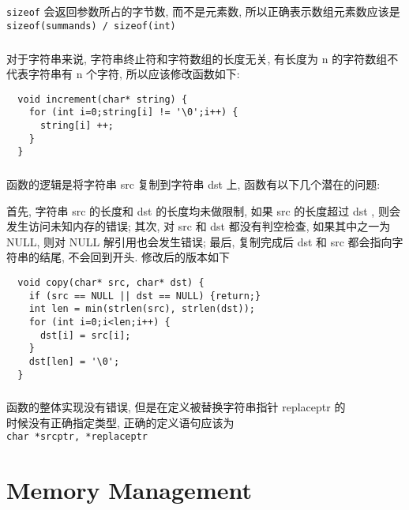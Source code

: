 \documentclass[UTF8,nofonts]{ctexart}
\begin{document}
\subsection{}
\subsubsection{}
\texttt{sizeof} 会返回参数所占的字节数, 而不是元素数, 所以正确表示数组元素数应该是 \texttt{sizeof(summands) / sizeof(int)}

\subsubsection{}
对于字符串来说, 字符串终止符和字符数组的长度无关, 有长度为 n 的字符数组不代表字符串有 n 个字符, 所以应该修改函数如下:

\begin{verbatim}
  void increment(char* string) {
    for (int i=0;string[i] != '\0';i++) {
      string[i] ++;
    }
  }
\end{verbatim}

\subsubsection{}
函数的逻辑是将字符串 src 复制到字符串 dst 上, 函数有以下几个潜在的问题:

首先, 字符串 src 的长度和 dst 的长度均未做限制, 如果 src 的长度超过 dst , 则会发生访问未知内存的错误; 其次, 对 src 和 dst 都没有判空检查, 如果其中之一为 NULL, 则对 NULL 解引用也会发生错误; 最后, 复制完成后 dst 和 src 都会指向字符串的结尾, 不会回到开头. 修改后的版本如下

\begin{verbatim}
  void copy(char* src, char* dst) {
    if (src == NULL || dst == NULL) {return;}
    int len = min(strlen(src), strlen(dst));
    for (int i=0;i<len;i++) {
      dst[i] = src[i];
    }
    dst[len] = '\0';
  }
\end{verbatim}

\subsubsection{}
函数的整体实现没有错误, 但是在定义被替换字符串指针 replaceptr 的\\时候没有正确指定类型, 正确的定义语句应该为\\ \texttt{char *srcptr, *replaceptr}

\section{Memory Management}
\end{document}
